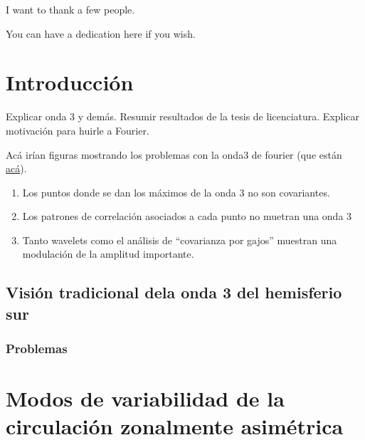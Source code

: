 \documentclass[12pt,oneside]{reedthesis}
\providecommand{\tightlist}{%
  \setlength{\itemsep}{0pt}\setlength{\parskip}{0pt}}
\begin{document}
  \begin{acknowledgements}
    I want to thank a few people.
  \end{acknowledgements}

  \hypersetup{linkcolor=black}
  \setcounter{secnumdepth}{2}
  \setcounter{tocdepth}{2}
  \tableofcontents

  \listoftables

  \listoffigures
  \begin{dedication}
    You can have a dedication here if you wish.
  \end{dedication}
\mainmatter %
\pagestyle{fancyplain} %

\hypertarget{introducciuxf3n}{%
\chapter{Introducción}\label{introducciuxf3n}}

Explicar onda 3 y demás. Resumir resultados de la tesis de licenciatura.
Explicar motivación para huirle a Fourier.

Acá irían figuras mostrando los problemas con la onda3 de fourier (que están \href{http://htmlpreview.github.io/?https://github.com/eliocamp/onda3/blob/master/30-no-zw.html}{acá}).
\begin{enumerate}
\def\labelenumi{\arabic{enumi}.}
\tightlist
\item
  Los puntos donde se dan los máximos de la onda 3 no son covariantes.
\item
  Los patrones de correlación asociados a cada punto no muetran una onda 3
\item
  Tanto wavelets como el análisis de ``covarianza por gajos'' muestran una modulación de la amplitud importante.
\end{enumerate}
\hypertarget{visiuxf3n-tradicional-dela-onda-3-del-hemisferio-sur}{%
\section{Visión tradicional dela onda 3 del hemisferio sur}\label{visiuxf3n-tradicional-dela-onda-3-del-hemisferio-sur}}

\hypertarget{problemas}{%
\subsection{Problemas}\label{problemas}}

\hypertarget{modos-de-variabilidad-de-la-circulaciuxf3n-zonalmente-asimuxe9trica}{%
\chapter{Modos de variabilidad de la circulación zonalmente asimétrica}\label{modos-de-variabilidad-de-la-circulaciuxf3n-zonalmente-asimuxe9trica}}
\end{document}
